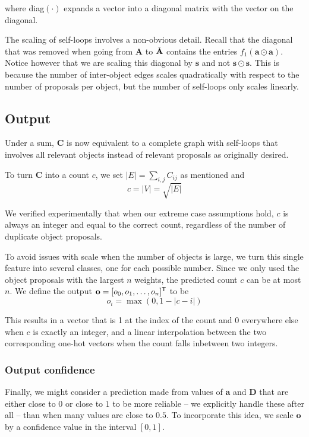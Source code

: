 \documentclass[letterpaper]{article}
\newcommand{\m}[1]{\mathbf{#1}}
\begin{document}
where diag$(\cdot)$ expands a vector into a diagonal matrix with the vector on the diagonal.

The scaling of self-loops involves a non-obvious detail.
Recall that the diagonal that was removed when going from $\m A$ to $\AO$ contains the entries $f_1(\m a \odot \m a)$.
Notice however that we are scaling this diagonal by $\m s$ and not $\m s \odot \m s$.
This is because the number of inter-object edges scales quadratically with respect to the number of proposals per object, but the number of self-loops only scales linearly.

\subsection{Output}
Under a sum, $\m C$ is now equivalent to a complete graph with self-loops that involves all relevant objects instead of relevant proposals as originally desired.

To turn $\m C$ into a count $c$, we set $|E| = \sum_{i,j} C_{ij}$ as mentioned and
\begin{equation}
    c = |V| = \sqrt{|E|}
\end{equation}

We verified experimentally that when our extreme case assumptions hold, $c$ is always an integer and equal to the correct count, regardless of the number of duplicate object proposals.

To avoid issues with scale when the number of objects is large, we turn this single feature into several classes, one for each possible number.
Since we only used the object proposals with the largest $n$ weights, the predicted count $c$ can be at most $n$.
We define the output $\m o = [o_0, o_1, \ldots, o_n]^\T$ to be
\begin{equation}\label{eq:output}
    o_i = \max(0, 1 - |c - i|)
\end{equation}

This results in a vector that is 1 at the index of the count and 0 everywhere else when $c$ is exactly an integer, and a linear interpolation between the two corresponding one-hot vectors when the count falls inbetween two integers.

\subsubsection{Output confidence}
Finally, we might consider a prediction made from values of $\m a$ and $\m D$ that are either close to $0$ or close to $1$ to be more reliable -- we explicitly handle these after all -- than when many values are close to $0.5$.
To incorporate this idea, we scale $\m o$ by a confidence value in the interval $[0, 1]$.
\end{document}
